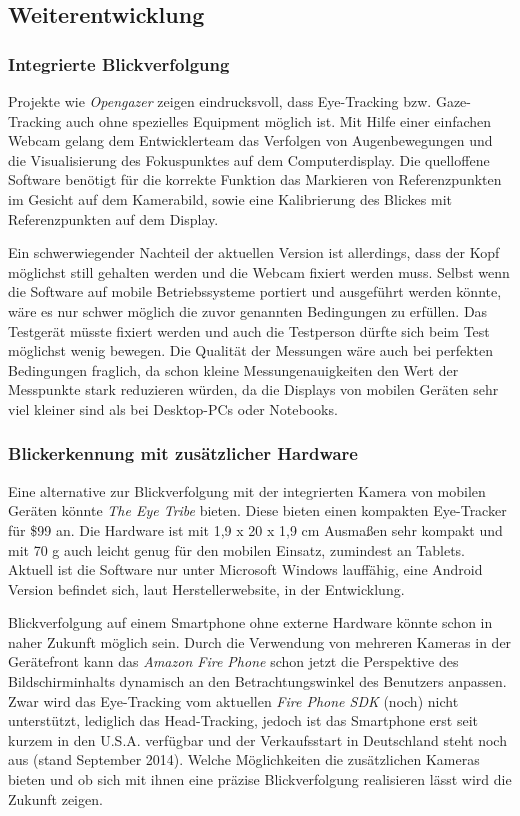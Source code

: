 \subsection{Weiterentwicklung}
\subsubsection{Integrierte Blickverfolgung}
Projekte wie \emph{Opengazer} \cite{TheInferenceGroup..2009} zeigen eindrucksvoll, dass Eye-Tracking bzw. Gaze-Tracking auch ohne spezielles Equipment möglich ist.
Mit Hilfe einer einfachen Webcam gelang dem Entwicklerteam das Verfolgen von Augenbewegungen und die Visualisierung des Fokuspunktes auf dem Computerdisplay.
Die quelloffene Software benötigt für die korrekte Funktion das Markieren von Referenzpunkten im Gesicht auf dem Kamerabild, sowie eine Kalibrierung des Blickes mit Referenzpunkten auf dem Display.

Ein schwerwiegender Nachteil der aktuellen Version ist allerdings, dass der Kopf möglichst still gehalten werden und die Webcam fixiert werden muss.
Selbst wenn die Software auf mobile Betriebssysteme portiert und ausgeführt werden könnte, wäre es nur schwer möglich die zuvor genannten Bedingungen zu erfüllen.
Das Testgerät müsste fixiert werden und auch die Testperson dürfte sich beim Test möglichst wenig bewegen.
Die Qualität der Messungen wäre auch bei perfekten Bedingungen fraglich, da schon kleine Messungenauigkeiten den Wert der Messpunkte stark reduzieren würden, da die Displays von mobilen Geräten sehr viel kleiner sind als bei Desktop-PCs oder Notebooks.

\subsubsection{Blickerkennung mit zusätzlicher Hardware}
Eine alternative zur Blickverfolgung mit der integrierten Kamera von mobilen Geräten könnte \emph{The Eye Tribe} \cite{TheEyeTribe.2014} bieten.
Diese bieten einen kompakten Eye-Tracker für \$99 an.
Die Hardware ist mit 1,9 x 20 x 1,9 cm Ausmaßen sehr kompakt und mit 70 g auch leicht genug für den mobilen Einsatz, zumindest an Tablets.
Aktuell ist die Software nur unter Microsoft Windows lauffähig, eine Android Version befindet sich, laut Herstellerwebsite, in der Entwicklung.

Blickverfolgung auf einem Smartphone ohne externe Hardware könnte schon in naher Zukunft möglich sein.
Durch die Verwendung von mehreren Kameras in der Gerätefront kann das \emph{Amazon Fire Phone} \cite{amazon.de.2014} schon jetzt die Perspektive des Bildschirminhalts dynamisch an den Betrachtungswinkel des Benutzers anpassen.
Zwar wird das Eye-Tracking vom aktuellen \emph{Fire Phone \ac{SDK}} (noch) nicht unterstützt, lediglich das Head-Tracking, jedoch ist das Smartphone erst seit kurzem in den U.S.A. verfügbar und der Verkaufsstart in Deutschland steht noch aus (stand September 2014).
Welche Möglichkeiten die zusätzlichen Kameras bieten und ob sich mit ihnen eine präzise Blickverfolgung realisieren lässt wird die Zukunft zeigen.